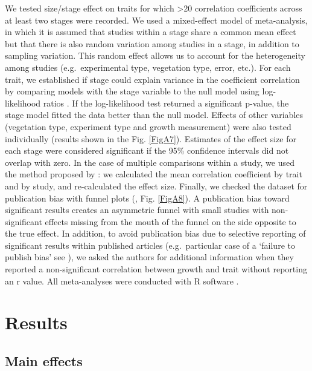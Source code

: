 \documentclass[a4paper]{article}\usepackage[]{graphicx}\usepackage[]{color}
\begin{document}
We tested size/stage effect on traits for which \textgreater{}20 correlation coefficients across at least two stages were recorded. We used a mixed-effect model of meta-analysis, in which it is assumed that studies within a stage share a common mean effect but that there is also random variation among studies in a stage, in addition to sampling variation. This random effect allows us to account for the heterogeneity among studies (e.g.~experimental type, vegetation type, error, etc.). For each trait, we established if stage could explain variance in the coefficient correlation by comparing models with the stage variable to the null model using log-likelihood ratios \citep{Zuur:2009cfa}. If the log-likelihood test returned a significant p-value, the stage model fitted the data better than the null model. Effects of other variables (vegetation type, experiment type and growth measurement) were also tested individually (results shown in the Fig. \ref{FigA7}). Estimates of the effect size for each stage were considered significant if the 95\% confidence intervals did not overlap with zero. In the case of multiple comparisons within a study, we used the method proposed by \citet{Borenstein:2009um}: we calculated the mean correlation coefficient by trait and by study, and re-calculated the effect size. Finally, we checked the dataset for publication bias with funnel plots (\citealt{Koricheva:2013tz}, Fig. \ref{FigA8}). A publication bias toward significant results creates an asymmetric funnel with small studies with non-significant effects missing from the mouth of the funnel on the side opposite to the true effect. In addition, to avoid publication bias due to selective reporting of significant results within published articles (e.g.~particular case of a `failure to publish bias' see \citealt{Jennions:2013ta}), we asked the authors for additional information when they reported a non-significant correlation between growth and trait without reporting an r value. All meta-analyses were conducted with R software \citep{Ralanguageanden:2014wf}.

\section*{Results}\label{results}

\subsection*{Main effects}
\end{document}
